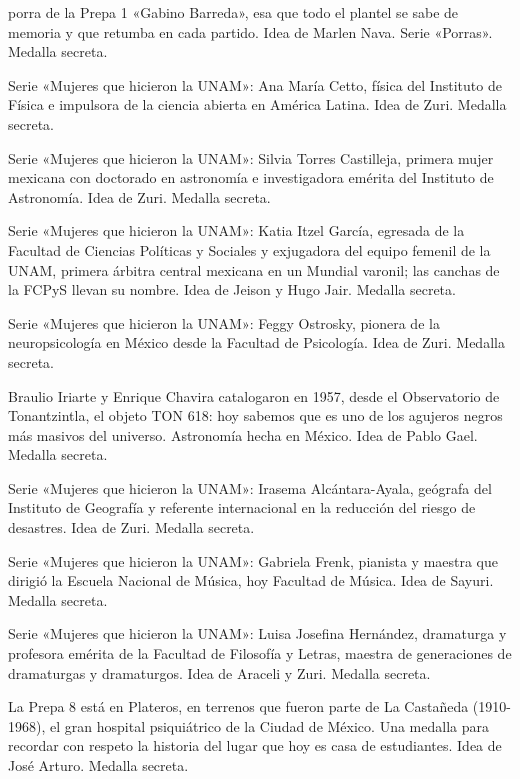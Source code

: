 \begin{description}[leftmargin=1.4cm, style=nextline]
  \item[G4B1N0] porra de la Prepa 1 «Gabino Barreda», esa que todo el plantel se sabe de memoria y que retumba en cada partido. Idea de Marlen Nava. Serie «Porras». Medalla secreta.
  \item[C3TT0] Serie «Mujeres que hicieron la UNAM»: Ana María Cetto, física del Instituto de Física e impulsora de la ciencia abierta en América Latina. Idea de Zuri. Medalla secreta.
  \item[S1LV14] Serie «Mujeres que hicieron la UNAM»: Silvia Torres Castilleja, primera mujer mexicana con doctorado en astronomía e investigadora emérita del Instituto de Astronomía. Idea de Zuri. Medalla secreta.
  \item[K4T14] Serie «Mujeres que hicieron la UNAM»: Katia Itzel García, egresada de la Facultad de Ciencias Políticas y Sociales y exjugadora del equipo femenil de la UNAM, primera árbitra central mexicana en un Mundial varonil; las canchas de la FCPyS llevan su nombre. Idea de Jeison y Hugo Jair. Medalla secreta.
  \item[0STR0SKY] Serie «Mujeres que hicieron la UNAM»: Feggy Ostrosky, pionera de la neuropsicología en México desde la Facultad de Psicología. Idea de Zuri. Medalla secreta.
  \item[TON618] Braulio Iriarte y Enrique Chavira catalogaron en 1957, desde el Observatorio de Tonantzintla, el objeto TON 618: hoy sabemos que es uno de los agujeros negros más masivos del universo. Astronomía hecha en México. Idea de Pablo Gael. Medalla secreta.
  \item[1R4S3M4] Serie «Mujeres que hicieron la UNAM»: Irasema Alcántara-Ayala, geógrafa del Instituto de Geografía y referente internacional en la reducción del riesgo de desastres. Idea de Zuri. Medalla secreta.
  \item[FR3NK] Serie «Mujeres que hicieron la UNAM»: Gabriela Frenk, pianista y maestra que dirigió la Escuela Nacional de Música, hoy Facultad de Música. Idea de Sayuri. Medalla secreta.
  \item[LU1S4J0] Serie «Mujeres que hicieron la UNAM»: Luisa Josefina Hernández, dramaturga y profesora emérita de la Facultad de Filosofía y Letras, maestra de generaciones de dramaturgas y dramaturgos. Idea de Araceli y Zuri. Medalla secreta.
  \item[C4ST4N3D4] La Prepa 8 está en Plateros, en terrenos que fueron parte de La Castañeda (1910-1968), el gran hospital psiquiátrico de la Ciudad de México. Una medalla para recordar con respeto la historia del lugar que hoy es casa de estudiantes. Idea de José Arturo. Medalla secreta.

\end{description}
